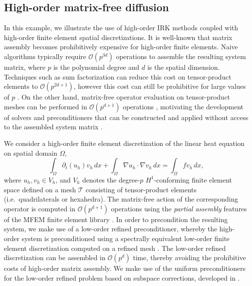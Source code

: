 \documentclass[a4paper,10pt]{article}
\begin{document}
\subsection{High-order matrix-free diffusion}

In this example, we illustrate the use of high-order IRK methods coupled with high-order finite element spatial discretizations.
It is well-known that matrix assembly becomes prohibitively expensive for high-order finite elements.
Naive algorithms typically require $\mathcal{O}(p^{3d})$ operations to assemble the resulting system matrix, where $p$ is the polynomial degree and $d$ is the spatial dimension.
Techniques such as sum factorization can reduce this cost on tensor-product elements to $\mathcal{O}(p^{2d+1})$, however this cost can still be prohibitive for large values of $p$ \cite{Melenk2001}.
On the other hand, matrix-free operator evaluation on tensor-product meshes can be performed in $\mathcal{O}(p^{d+1})$ operations \cite{Orszag1980}, motivating the development of solvers and preconditioners that can be constructed and applied without access to the assembled system matrix \cite{Kronbichler2019}.

We consider a high-order finite element discretization of the linear heat equation on spatial domain $\Omega$,
\[
	\int_\Omega \partial_t (u_h) v_h \, dx + \int_\Omega \nabla u_h \cdot \nabla v_h \, dx = \int_\Omega f v_h \, dx,
\]
where $u_h, v_h \in V_h$, and $V_h$ denotes the degree-$p$ $H^1$-conforming finite element space defined on a mesh $\mathcal{T}$ consisting of tensor-product elements (i.e.\ quadrilaterals or hexahedra).
The matrix-free action of the corresponding operator is computed in $\mathcal{O}(p^{d+1})$ operations using the \textit{partial assembly} features of the MFEM finite element library \cite{Anderson2020}.
In order to precondition the resulting system, we make use of a low-order refined preconditioner, whereby the high-order system is preconditioned using a spectrally equivalent low-order finite element discretization computed on a refined mesh \cite{Canuto2010}.
The low-order refined discretization can be assembled in $\mathcal{O}(p^d)$ time, thereby avoiding the prohibitive costs of high-order matrix assembly.
We make use of the uniform preconditioners for the low-order refined problem based on subspace corrections, developed in \cite{Pazner2019a}.
\end{document}
